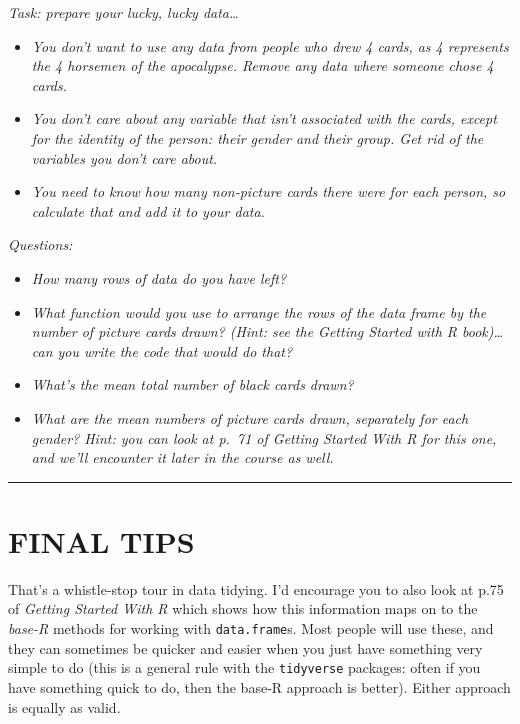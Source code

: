 \documentclass[
]{book}
\providecommand{\tightlist}{%
  \setlength{\itemsep}{0pt}\setlength{\parskip}{0pt}}
\begin{document}
\emph{Task: prepare your lucky, lucky data\ldots{}}

\begin{itemize}
\tightlist
\item
  \emph{You don't want to use any data from people who drew 4 cards, as 4 represents
  the 4 horsemen of the apocalypse. Remove any data where someone chose 4 cards.}
\item
  \emph{You don't care about any variable that isn't associated with the cards, except
  for the identity of the person: their gender and their group. Get rid of the
  variables you don't care about.}
\item
  \emph{You need to know how many non-picture cards there were for each person, so
  calculate that and add it to your data.}\\
\end{itemize}

\emph{Questions:}

\begin{itemize}
\tightlist
\item
  \emph{How many rows of data do you have left?}
\item
  \emph{What function would you use to arrange the rows of the data frame by the number of
  picture cards drawn? (Hint: see the Getting Started with R book)\ldots{} can you
  write the code that would do that?}
\item
  \emph{What's the mean total number of black cards drawn?}
\item
  \emph{What are the mean numbers of picture cards drawn, separately for each gender?
  Hint: you can look at p.~71 of Getting Started With R for this one, and we'll
  encounter it later in the course as well.}\\
\end{itemize}

\begin{center}\rule{0.5\linewidth}{0.5pt}\end{center}

\hypertarget{final-tips}{%
\section{FINAL TIPS}\label{final-tips}}

That's a whistle-stop tour in data tidying. I'd encourage you to also look at
p.75 of \emph{Getting Started With R} which shows how this information maps on to
the \emph{base-R} methods for working with \texttt{data.frame}s. Most people will use these,
and they can sometimes be quicker and easier when you just have something
very simple to do (this is a general rule with the \texttt{tidyverse} packages:
often if you have something quick to do, then the base-R approach is better).
Either approach is equally as valid.\\
~\\
\end{document}
